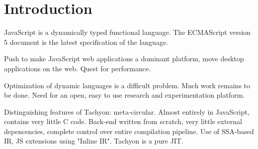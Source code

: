 \section{Introduction}

JavaScript is a dynamically typed functional language.
The ECMAScript version 5 document \cite{ECMAScript09}
is the latest specification of the language.

Push to make JavaScript web applications a dominant platform, move desktop
applications on the web. Quest for performance.

Optimization of dynamic languages is a difficult problem. Much work remains
to be done. Need for an open, easy to use research and experimentation platform.

Distinguishing features of Tachyon: meta-circular. Almost entirely in JavaScript,
contains very little C code. Back-end written from scratch, very little
external depencencies, complete control over entire compilation pipeline.
Use of SSA-based IR, JS extensions using "Inline IR". Tachyon is a pure JIT.
